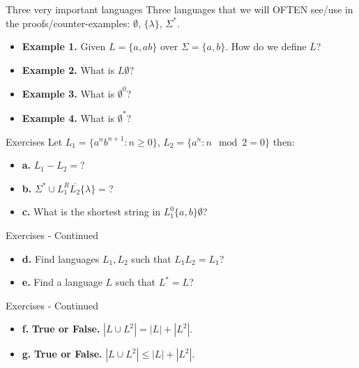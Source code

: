 \documentclass[10pt]{beamer}
\begin{document}
\begin{frame}[t]{Three very important languages}
    Three languages that we will OFTEN see/use in the proofs/counter-examples: $\emptyset$, $\{\lambda\}$, $\Sigma^*$.
    \begin{itemize}[itemsep=5mm, parsep=0pt]
        \item \textbf{Example 1.} Given $L = \{a, ab\}$ over $\Sigma = \{a,b\}$. How do we define $\overline{L}$?\\
        \item \textbf{Example 2.} What is $L\emptyset$?\\
        \item \textbf{Example 3.} What is $\emptyset^0$?\\
        \item \textbf{Example 4.} What is $\emptyset^*$?\\

    \end{itemize}
\end{frame}

\begin{frame}[t]{Exercises}
    Let $L_1 = \{a^nb^{n+1} : n \geq 0\}$, $L_2 = \{a^n : n \mod 2 = 0\}$ then:
    \begin{itemize}[itemsep=5mm, parsep=0pt]
        \item \textbf{a.} $L_1 - L_2 = $?\\
        \item \textbf{b.} $\Sigma^* \cup L_1^R\overline{L_2}\{\lambda\}=$?\\
        \item \textbf{c.} What is the shortest string in $L_1^0\{a,b\}\emptyset$?\\
    \end{itemize}
\end{frame}

\begin{frame}[t]{Exercises - Continued}
    \begin{itemize}[itemsep=30mm, parsep=0pt]
        \item \textbf{d.} Find languages $L_1, L_2$ such that $L_1L_2 = L_1$?\\

        \item \textbf{e.} Find a language $L$ such that $L^* = L$?\\
    \end{itemize}
\end{frame}

\begin{frame}[t]{Exercises - Continued}
    \begin{itemize}[itemsep=15mm, parsep=0pt]
        \item \textbf{f.} \textbf{True or False.} $|L \cup L^2| = |L| + |L^2|$.
        \item \textbf{g.} \textbf{True or False.} $|L \cup L^2| \leq |L| + |L^2|$.
    \end{itemize}
\end{frame}
\end{document}
